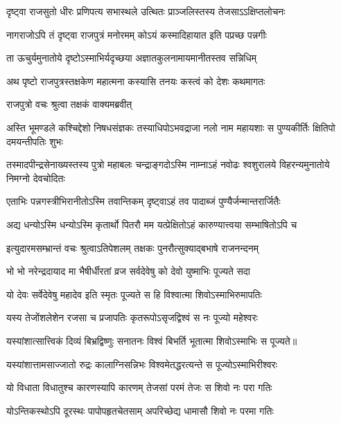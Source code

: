 \twolineshloka
{दृष्ट्वा राजसुतो धीरः प्रणिपत्य सभास्थले}
{उत्थितः प्राञ्जलिस्तस्य तेजसाऽऽक्षिप्तलोचनः} %

\twolineshloka
{नागराजोऽपि तं दृष्ट्वा राजपुत्रं मनोरमम्}
{कोऽयं कस्मादिहायात इति पप्रच्छ पन्नगीः} %

\twolineshloka
{ता ऊचुर्यमुनातोये दृष्टोऽस्माभिर्यदृच्छया}
{अज्ञातकुलनामायमानीतस्तव सन्निधिम्} %

\twolineshloka
{अथ पृष्टो राजपुत्रस्तक्षकेण महात्मना}
{कस्यासि तनयः कस्त्वं को देशः कथमागतः} %

\onelineshloka
{राजपुत्रो वचः श्रुत्वा तक्षकं वाक्यमब्रवीत्} %

\threelineshloka
{अस्ति भूमण्डले कश्चिद्देशो निषधसंज्ञकः}
{तस्याधिपोऽभवद्राजा नलो नाम महायशाः}
{स पुण्यकीर्तिः क्षितिपो दमयन्तीपतिः शुभः} %

\threelineshloka
{तस्मादपीन्द्रसेनाख्यस्तस्य पुत्रो महाबलः}
{चन्द्राङ्गदोऽस्मि नाम्नाऽहं नवोढः श्वशुरालये}
{विहरन्यमुनातोये निमग्नो देवचोदितः} %

\twolineshloka
{एताभिः पन्नगस्त्रीभिरानीतोऽस्मि तवान्तिकम्}
{दृष्ट्वाऽहं तव पादाब्जं पुण्यैर्जन्मान्तरार्जितैः} %

\twolineshloka
{अद्य धन्योऽस्मि धन्योऽस्मि कृतार्थो पितरौ मम}
{यत्प्रेक्षितोऽहं कारुण्यात्त्वया सम्भाषितोऽपि च} %

\twolineshloka
{इत्युदारमसम्भ्रान्तं वचः श्रुत्वाऽतिपेशलम्}
{तक्षकः पुनरौत्सुक्याद्बभाषे राजनन्दनम्} %

\twolineshloka
{भो भो नरेन्द्रदायाद मा भैषीर्धीरतां व्रज}
{सर्वदेवेषु को देवो युष्माभिः पूज्यते सदा} %

\twolineshloka
{यो देवः सर्वेदेवेषु महादेव इति स्मृतः}
{पूज्यते स हि विश्वात्मा शिवोऽस्माभिरुमापतिः} %

\twolineshloka
{यस्य तेजोंशलेशेन रजसा च प्रजापतिः}
{कृतरूपोऽसृजद्विश्वं स नः पूज्यो महेश्वरः} %

\twolineshloka
{यस्यांशात्सात्त्विकं दिव्यं बिभ्रद्विष्णुः सनातनः}
{विश्वं बिभर्ति भूतात्मा शिवोऽस्माभिः स पूज्यते॥} %

\twolineshloka
{यस्यांशात्तामसाज्जातो रुद्रः कालाग्निसन्निभः}
{विश्वमेतद्धरत्यन्ते स पूज्योऽस्माभिरीश्वरः} %

\twolineshloka
{यो विधाता विधातुश्च कारणस्यापि कारणम्}
{तेजसां परमं तेजः स शिवो नः परा गतिः} %

\twolineshloka
{योऽन्तिकस्थोऽपि दूरस्थः पापोपहृतचेतसाम्}
{अपरिच्छेद्य धामासौ शिवो नः परमा गतिः} %

